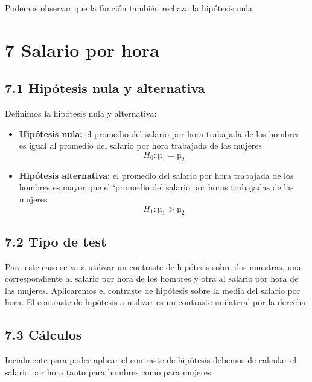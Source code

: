 \documentclass[
  a4paper]{article}
\newenvironment{Shaded}{\begin{snugshade}}{\end{snugshade}}
\newcommand{\CommentTok}[1]{\textcolor[rgb]{0.56,0.35,0.01}{\textit{#1}}}
\newcommand{\DecValTok}[1]{\textcolor[rgb]{0.00,0.00,0.81}{#1}}
\newcommand{\FunctionTok}[1]{\textcolor[rgb]{0.00,0.00,0.00}{#1}}
\newcommand{\NormalTok}[1]{#1}
\newcommand{\OtherTok}[1]{\textcolor[rgb]{0.56,0.35,0.01}{#1}}
\newcommand{\SpecialCharTok}[1]{\textcolor[rgb]{0.00,0.00,0.00}{#1}}
\providecommand{\tightlist}{%
  \setlength{\itemsep}{0pt}\setlength{\parskip}{0pt}}
\begin{document}
Podemos observar que la función también rechaza la hipótesis nula.

\hypertarget{salario-por-hora}{%
\section{7 Salario por hora}\label{salario-por-hora}}

\hypertarget{hipuxf3tesis-nula-y-alternativa-1}{%
\subsection{7.1 Hipótesis nula y
alternativa}\label{hipuxf3tesis-nula-y-alternativa-1}}

Definimos la hipótesis nula y alternativa:

\begin{itemize}
\tightlist
\item
  \textbf{Hipótesis nula:} el promedio del salario por hora trabajada de
  los hombres es igual al promedio del salario por hora trabajada de las
  mujeres \[H_0: µ_1 = µ_2 \]
\item
  \textbf{Hipótesis alternativa:} el promedio del salario por hora
  trabajada de los hombres es mayor que el `promedio del salario por
  horas trabajadas de las mujeres \[H_1: µ_1 > µ_2\]
\end{itemize}

\hypertarget{tipo-de-test-1}{%
\subsection{7.2 Tipo de test}\label{tipo-de-test-1}}

Para este caso se va a utilizar un contraste de hipótesis sobre dos
muestras, una correspondiente al salario por hora de los hombres y otra
al salario por hora de las mujeres. Aplicaremos el contraste de
hipótesis sobre la media del salario por hora. El contraste de hipótesis
a utilizar es un contraste unilateral por la derecha.

\hypertarget{cuxe1lculos-4}{%
\subsection{7.3 Cálculos}\label{cuxe1lculos-4}}

Incialmente para poder aplicar el contraste de hipótesis debemos de
calcular el salario por hora tanto para hombres como para mujeres

\begin{Shaded}
\end{Shaded}
\end{document}
